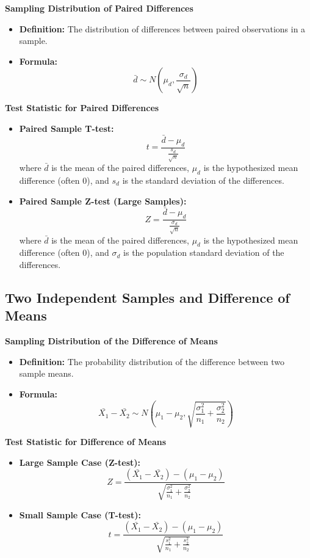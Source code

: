 \documentclass{article}
\begin{document}
\textbf{Sampling Distribution of Paired Differences}
\begin{itemize}
    \item \textbf{Definition:} The distribution of differences between paired observations in a sample.
    \item \textbf{Formula:}
    \[
    \bar{d} \sim N\left(\mu_d, \frac{\sigma_d}{\sqrt{n}}\right)
    \]
\end{itemize}

\textbf{Test Statistic for Paired Differences}
\begin{itemize}
    \item \textbf{Paired Sample T-test:}
    \[
    t = \frac{\bar{d} - \mu_d}{\frac{s_d}{\sqrt{n}}}
    \]
    where \(\bar{d}\) is the mean of the paired differences, \(\mu_d\) is the hypothesized mean difference (often 0), and \(s_d\) is the standard deviation of the differences.
    \item \textbf{Paired Sample Z-test (Large Samples):}
    \[
    Z = \frac{\bar{d} - \mu_d}{\frac{\sigma_d}{\sqrt{n}}}
    \]
    where \(\bar{d}\) is the mean of the paired differences, \(\mu_d\) is the hypothesized mean difference (often 0), and \(\sigma_d\) is the population standard deviation of the differences.
\end{itemize}

\subsection*{Two Independent Samples and Difference of Means}

\textbf{Sampling Distribution of the Difference of Means}
\begin{itemize}
    \item \textbf{Definition:} The probability distribution of the difference between two sample means.
    \item \textbf{Formula:}
    \[
    \bar{X_1} - \bar{X_2} \sim N\left(\mu_1 - \mu_2, \sqrt{\frac{\sigma_1^2}{n_1} + \frac{\sigma_2^2}{n_2}}\right)
    \]
\end{itemize}

\textbf{Test Statistic for Difference of Means}
\begin{itemize}
    \item \textbf{Large Sample Case (Z-test):}
    \[
    Z = \frac{(\bar{X_1} - \bar{X_2}) - (\mu_1 - \mu_2)}{\sqrt{\frac{\sigma_1^2}{n_1} + \frac{\sigma_2^2}{n_2}}}
    \]
    \item \textbf{Small Sample Case (T-test):}
    \[
    t = \frac{(\bar{X_1} - \bar{X_2}) - (\mu_1 - \mu_2)}{\sqrt{\frac{s_1^2}{n_1} + \frac{s_2^2}{n_2}}}
    \]
\end{itemize}
\end{document}
